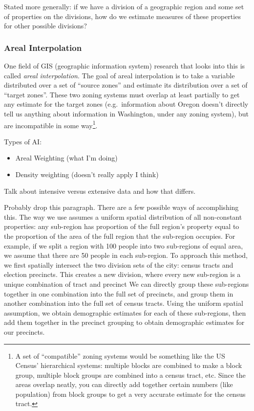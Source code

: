 \documentclass[12pt,twoside]{reedthesis}
\theoremstyle{definition}
\theoremstyle{definition}
\theoremstyle{definition}
\theoremstyle{remark}
\begin{document}
Stated more generally: if we have a division of a geographic region and
some set of properties on the divisions, how do we estimate measures of
these properties for other possible divisions?

\hypertarget{areal-interpolation}{%
\subsubsection{Areal Interpolation}\label{areal-interpolation}}

One field of GIS (geographic information system) research that looks
into this is called \emph{areal interpolation}. The goal of areal
interpolation is to take a variable distributed over a set of ``source
zones'' and estimate its distribution over a set of ``target zones''.
These two zoning systems must overlap at least partially to get any
estimate for the target zones (e.g.~information about Oregon doesn't
directly tell us anything about information in Washington, under any
zoning system), but are incompatible in some way\footnote{A set of
  ``compatible'' zoning systems would be something like the US Census'
  hierarchical systems: multiple blocks are combined to make a block
  group, multiple block groups are combined into a census tract, etc.
  Since the areas overlap neatly, you can directly add together certain
  numbers (like population) from block groups to get a very accurate
  estimate for the census tract.}.

Types of AI:
\begin{itemize}
\item
  Areal Weighting (what I'm doing)
\item
  Density weighting (doesn't really apply I think)
\end{itemize}
Talk about intensive versus extensive data and how that differs.

Probably drop this paragraph. There are a few possible ways of
accomplishing this. The way we use assumes a uniform spatial
distribution of all non-constant properties: any sub-region has
proportion of the full region's property equal to the proportion of the
area of the full region that the sub-region occupies. For example, if we
split a region with 100 people into two sub-regions of equal area, we
assume that there are 50 people in each sub-region. To approach this
method, we first spatially intersect the two division sets of the city:
census tracts and election precincts. This creates a new division, where
every new sub-region is a unique combination of tract and precinct We
can directly group these sub-regions together in one combination into
the full set of precincts, and group them in another combination into
the full set of census tracts. Using the uniform spatial assumption, we
obtain demographic estimates for each of these sub-regions, then add
them together in the precinct grouping to obtain demographic estimates
for our precincts.
\end{document}
